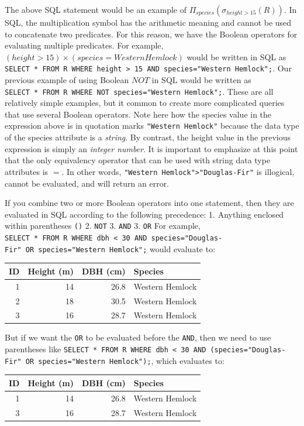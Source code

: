 \documentclass[
]{book}
\begin{document}
The above SQL statement would be an example of \(Π_{species}(σ_{height>15}(R))\). In SQL, the multiplication symbol has the arithmetic meaning and cannot be used to concatenate two predicates. For this reason, we have the Boolean operators for evaluating multiple predicates. For example, \((height>15)×(species=WesternHemlock)\) would be written in SQL as \texttt{SELECT\ *\ FROM\ R\ WHERE\ height\ \textgreater{}\ 15\ AND\ species="Western\ Hemlock";}. Our previous example of using Boolean \(NOT\) in SQL would be written as \texttt{SELECT\ *\ FROM\ R\ WHERE\ NOT\ species="Western\ Hemlock";}. These are all relatively simple examples, but it common to create more complicated queries that use several Boolean operators. Note here how the species value in the expression above is in quotation marks \texttt{"Western\ Hemlock"} because the data type of the species attribute is a \emph{string}. By contrast, the height value in the previous expression is simply an \emph{integer number}. It is important to emphasize at this point that the only equivalency operator that can be used with string data type attributes is \(=\). In other words, \texttt{"Western\ Hemlock"\textgreater{}"Douglas-Fir"} is illogical, cannot be evaluated, and will return an error.

If you combine two or more Boolean operators into one statement, then they are evaluated in SQL according to the following precedence:
1. Anything enclosed within parentheses \texttt{()}
2. \texttt{NOT}
3. \texttt{AND}
3. \texttt{OR}
For example, \texttt{SELECT\ *\ FROM\ R\ WHERE\ dbh\ \textless{}\ 30\ AND\ species="Douglas-Fir"\ OR\ species="Western\ Hemlock";} would evaluate to:

\begin{tabular}{rrrl}
\toprule
ID & Height (m) & DBH (cm) & Species\\
\midrule
1 & 14 & 26.8 & Western Hemlock\\
2 & 18 & 30.5 & Western Hemlock\\
3 & 16 & 28.7 & Western Hemlock\\
\bottomrule
\end{tabular}

But if we want the \texttt{OR} to be evaluated before the \texttt{AND}, then we need to use parentheses like \texttt{SELECT\ *\ FROM\ R\ WHERE\ dbh\ \textless{}\ 30\ AND\ (species="Douglas-Fir"\ OR\ species="Western\ Hemlock");}, which evaluates to:

\begin{tabular}{rrrl}
\toprule
ID & Height (m) & DBH (cm) & Species\\
\midrule
1 & 14 & 26.8 & Western Hemlock\\
3 & 16 & 28.7 & Western Hemlock\\
\bottomrule
\end{tabular}
\end{document}
